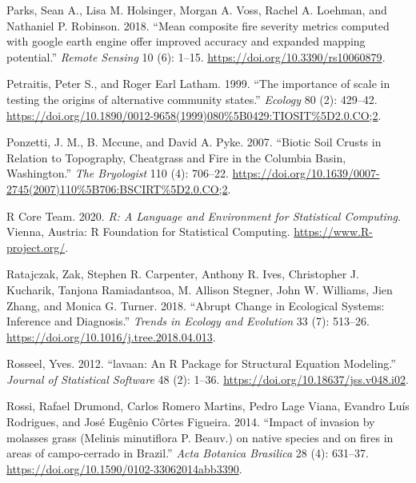 \documentclass[
  12pt,
]{article}
\newlength{\cslhangindent}
\newlength{\cslentryspacingunit} %
\newenvironment{CSLReferences}[2] %
 {%
  \setlength{\parindent}{0pt}
  \ifodd #1
  \let\oldpar\par
  \def\par{\hangindent=\cslhangindent\oldpar}
  \fi
  \setlength{\parskip}{#2\cslentryspacingunit}
 }%
 {}
\begin{document}
\begin{CSLReferences}{1}{0}
\leavevmode{}%
Parks, Sean A., Lisa M. Holsinger, Morgan A. Voss, Rachel A. Loehman,
and Nathaniel P. Robinson. 2018. {``{Mean composite fire severity
metrics computed with google earth engine offer improved accuracy and
expanded mapping potential}.''} \emph{Remote Sensing} 10 (6): 1--15.
\url{https://doi.org/10.3390/rs10060879}.

\leavevmode{}%
Petraitis, Peter S., and Roger Earl Latham. 1999. {``{The importance of
scale in testing the origins of alternative community states}.''}
\emph{Ecology} 80 (2): 429--42.
\url{https://doi.org/10.1890/0012-9658(1999)080\%5B0429:TIOSIT\%5D2.0.CO;2}.

\leavevmode{}%
Ponzetti, J. M., B. Mccune, and David A. Pyke. 2007. {``Biotic Soil
Crusts in Relation to Topography, Cheatgrass and Fire in the {Columbia}
{Basin}, {Washington}.''} \emph{The Bryologist} 110 (4): 706--22.
\url{https://doi.org/10.1639/0007-2745(2007)110\%5B706:BSCIRT\%5D2.0.CO;2}.

\leavevmode{}%
R Core Team. 2020. \emph{R: A Language and Environment for Statistical
Computing}. Vienna, Austria: R Foundation for Statistical Computing.
\url{https://www.R-project.org/}.

\leavevmode{}%
Ratajczak, Zak, Stephen R. Carpenter, Anthony R. Ives, Christopher J.
Kucharik, Tanjona Ramiadantsoa, M. Allison Stegner, John W. Williams,
Jien Zhang, and Monica G. Turner. 2018. {``{Abrupt Change in Ecological
Systems: Inference and Diagnosis}.''} \emph{Trends in Ecology and
Evolution} 33 (7): 513--26.
\url{https://doi.org/10.1016/j.tree.2018.04.013}.

\leavevmode{}%
Rosseel, Yves. 2012. {``{lavaan}: An {R} Package for Structural Equation
Modeling.''} \emph{Journal of Statistical Software} 48 (2): 1--36.
\url{https://doi.org/10.18637/jss.v048.i02}.

\leavevmode{}%
Rossi, Rafael Drumond, Carlos Romero Martins, Pedro Lage Viana, Evandro
Luís Rodrigues, and José Eugênio Côrtes Figueira. 2014. {``{Impact of
invasion by molasses grass (Melinis minutiflora P. Beauv.) on native
species and on fires in areas of campo-cerrado in Brazil}.''} \emph{Acta
Botanica Brasilica} 28 (4): 631--37.
\url{https://doi.org/10.1590/0102-33062014abb3390}.


\end{CSLReferences}
\end{document}
